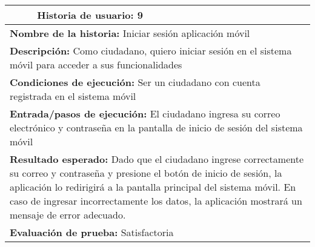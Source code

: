 \begin{longtable}{|p{6.7cm}|p{6.7cm}|}
    \hline
    \endlastfoot
    \multicolumn{1}{|p{6.7cm}|}{\textbf{Número} 9 } & \multicolumn{1}{|p{6.7cm}|}{\textbf{Historia de usuario:} 9}                                                                                                                                                                                                                                    \\
    \hline
    \multicolumn{2}{|p{13.4cm}|}{\textbf{Nombre de la historia:} Iniciar sesión aplicación móvil }                                                                                                                                                                                                                                                    \\
    \hline
    \multicolumn{2}{|p{13.4cm}|}{\textbf{Descripción:} Como ciudadano, quiero iniciar sesión en el sistema móvil para acceder a sus funcionalidades}                                                                                                                                                                                                  \\
    \hline
    \multicolumn{2}{|p{13.4cm}|}{\textbf{Condiciones de ejecución:} Ser un ciudadano con cuenta registrada en el sistema móvil}                                                                                                                                                                                                                       \\
    \hline
    \multicolumn{2}{|p{13.4cm}|}{\textbf{Entrada/pasos de ejecución:} El ciudadano ingresa su correo electrónico y contraseña en la pantalla de inicio de sesión del sistema móvil}                                                                                                                                                                   \\
    \hline
    \multicolumn{2}{|p{13.4cm}|}{\textbf{Resultado esperado:} Dado que el ciudadano ingrese correctamente su correo y contraseña y presione el botón de inicio de sesión, la aplicación lo redirigirá a la pantalla principal del sistema móvil. En caso de ingresar incorrectamente los datos, la aplicación mostrará un mensaje de error adecuado.} \\
    \hline
    \multicolumn{2}{|p{13.4cm}|}{\textbf{Evaluación de prueba:} Satisfactoria}                                                                                                                                                                                                                                                                        \\
    \hline
\end{longtable}

